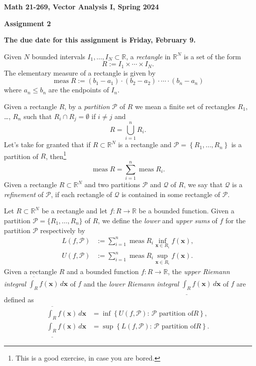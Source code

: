 \documentclass{article}%
\begin{document}
\begin{center}
\textbf{Math 21-269, Vector Analysis I, Spring 2024}

\textbf{Assignment 2}
\end{center}

\textbf{The due date for this assignment is Friday, February 9.}

Given $N$ bounded intervals $I_{1},\ldots,I_{N}\subset\mathbb{R}$, a
\emph{rectangle} in $\mathbb{R}^{N}$ is a set of the form
\[
R:=I_{1}\times\cdots\times I_{N}.
\]
The elementary measure of a rectangle is given by%
\[
\operatorname*{meas}R:=(b_{1}-a_{1})\cdot(b_{2}-a_{2})\cdot\cdots\cdot
(b_{n}-a_{n})
\]
where $a_{n}\leq b_{n}$ are the endpoints of $I_{n}$. 

Given a rectangle $R$, by a \emph{partition} $\mathcal{P}$ of $R$ we mean a
finite set of rectangles $R_{1}$, \ldots, $R_{n}$ such that $R_{i}\cap
R_{j}=\emptyset$ if $i\neq j$ and%
\[
R=\bigcup_{i=1}^{n}R_{i}.
\]
Let's take for granted that if $R\subset\mathbb{R}^{N}$ is a rectangle and
$\mathcal{P}=\left\{  R_{1},\ldots,R_{n}\right\}  $ is a partition of $R$,
then\footnote{This is a good exercise, in case you are bored.}%
\[
\operatorname*{meas}R=\sum_{i=1}^{n}\operatorname*{meas}R_{i}.
\]
Given a rectangle $R\subset\mathbb{R}^{N}$ and two partitions $\mathcal{P}$
and $\mathcal{Q}$ of $R$, we say that $\mathcal{Q}$ is a \emph{refinement} of
$\mathcal{P}$, if each rectangle of $\mathcal{Q}$ is contained in some
rectangle of $\mathcal{P}$. 

Let $R\subset\mathbb{R}^{N}$ be a rectangle and let $f:R\rightarrow\mathbb{R}$
be a bounded function. Given a partition $\mathcal{P}=\{R_{1},\ldots,R_{n}\}$
of $R$, we define the \emph{lower} and \emph{upper sums} of $f$ for the
partition $\mathcal{P}$ respectively by%
\begin{align*}
L\left(  f,\mathcal{P}\right)   &  :=\sum_{i=1}^{n}\operatorname*{meas}%
R_{i}\inf_{\boldsymbol{x}\in R_{i}}f\left(  \boldsymbol{x}\right)  ,\\
U\left(  f,\mathcal{P}\right)   &  :=\sum_{i=1}^{n}\operatorname*{meas}%
R_{i}\sup_{\boldsymbol{x}\in R_{i}}f\left(  \boldsymbol{x}\right)  .
\end{align*}
Given a rectangle $R$ and a bounded function $f:R\rightarrow\mathbb{R}$, the
\emph{upper Riemann integral} $\overline{\int_{R}}f\left(  \boldsymbol{x}%
\right)  \,d\boldsymbol{x}$ of $f$ and the \emph{lower Riemann integral}
$\underline{\int_{R}}f\left(  \boldsymbol{x}\right)  \,d\boldsymbol{x}$ of $f$
are defined as%
\begin{align*}
\overline{\int_{R}}f\left(  \boldsymbol{x}\right)  \,d\boldsymbol{x} &
=\inf\left\{  U\left(  f,\mathcal{P}\right)  :\,\mathcal{P}\text{ partition of
}R\right\}  ,\\
\underline{\int_{R}}f\left(  \boldsymbol{x}\right)  \,d\boldsymbol{x} &
=\sup\left\{  L\left(  f,\mathcal{P}\right)  :\,\mathcal{P}\text{ partition of
}R\right\}  .
\end{align*}
\end{document}
